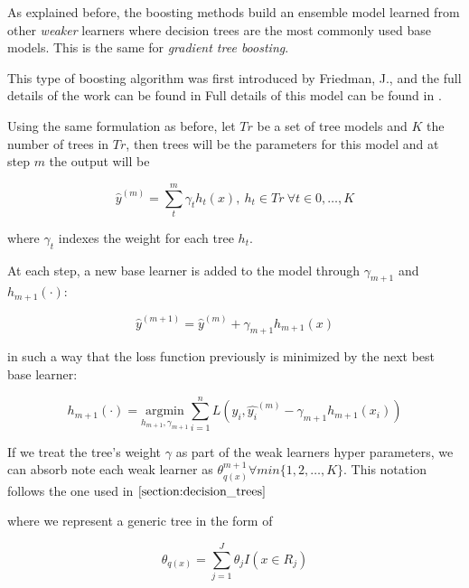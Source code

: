 As explained before, the boosting methods build an ensemble model learned from other \textit{weaker} learners where decision trees are the most commonly used base models.
This is the same for \textit{gradient tree boosting}.

This type of boosting algorithm was first introduced by Friedman, J., and the full details of the work can be found in Full details of this model can be found in \textcite{friedman-gradientBoosting2001}.

Using the same formulation as before, let $Tr$ be a set of tree models and $K$ the number of trees in $Tr$, then trees will be the parameters for this model and at step $m$ the output will be

\begin{equation}
\hat{y}^{(m)}= \sum_t^m \gamma_t h_t(x) , \ h_t \in Tr \ \forall t \in {0,\ldots,K}
\end{equation}

where $\gamma_t$ indexes the weight for each tree $h_t$.

At each step, a new base learner is added to the model through $\gamma_{m+1}$ and $h_{m+1}(\cdot)$:

\begin{equation}
\hat{y}^{(m+1)} =  \hat{y}^{(m)} + \gamma_{m+1} h_{m+1}(x)
\end{equation}

in such a way that the loss function previously is minimized by the next best base learner:

\begin{equation}\label{eq:boosting_iterative_minimization}
h_{m+1}(\cdot) = \underset{h_{m+1},\gamma_{m+1}}{\mathrm{argmin}}  \sum_{i=1}^{n} L ( y_i, \hat{y_i}^{(m)} - \gamma_{m+1} h_{m+1}(x_i) )
\end{equation}


If we treat the tree's weight $\gamma$ as part of the weak learners hyper parameters, we can absorb note each weak learner as $\theta^{m+1}_{q(x)} \forall m in \{1,2,\ldots,K \}$.
This notation follows the one used in $\cref{section:decision_trees}$

where we represent a generic tree in the form of

\begin{equation}
\theta_{q(x)} = \sum_{j=1}^J \theta_j I(x \in R_j)
\end{equation}


%


